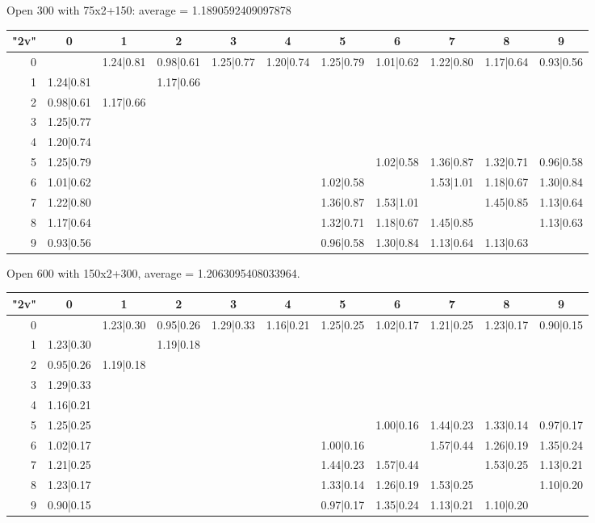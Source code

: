 \begin{table}
		\centering
	
	Open 300 with 75x2+150: average = 1.1890592409097878
	
	
	
	\begin{tabular}{|r||c|c|c|c|c|c|c|c|c|c|}\hline
		{\bf "2v"} & 0 & 1 & 2 & 3 & 4 & 5 & 6 & 7 & 8 & 9 \\\hline\hline
		0 & &1.24|0.81 &0.98|0.61 &1.25|0.77 &1.20|0.74 &1.25|0.79 &1.01|0.62 &1.22|0.80 &1.17|0.64 &0.93|0.56  \\\hline
		1 &1.24|0.81 & &1.17|0.66 & & & & & & &  \\\hline
		2 &0.98|0.61 &1.17|0.66 & & & & & & & &  \\\hline
		3 &1.25|0.77 & & & & & & & & &  \\\hline
		4 &1.20|0.74 & & & & & & & & &  \\\hline
		5 &1.25|0.79 & & & & & &1.02|0.58 &1.36|0.87 &1.32|0.71 &0.96|0.58  \\\hline
		6 &1.01|0.62 & & & & &1.02|0.58 & &1.53|1.01 &1.18|0.67 &1.30|0.84  \\\hline
		7 &1.22|0.80 & & & & &1.36|0.87 &1.53|1.01 & &1.45|0.85 &1.13|0.64  \\\hline
		8 &1.17|0.64 & & & & &1.32|0.71 &1.18|0.67 &1.45|0.85 & &1.13|0.63  \\\hline
		9 &0.93|0.56 & & & & &0.96|0.58 &1.30|0.84 &1.13|0.64 &1.13|0.63 &  \\\hline
	\end{tabular}
	
	\vspace{0.6cm}
	
	
	Open 600 with 150x2+300, average = 1.2063095408033964.
	
		\begin{tabular}{|r||c|c|c|c|c|c|c|c|c|c|}\hline
		{\bf "2v"} & 0 & 1 & 2 & 3 & 4 & 5 & 6 & 7 & 8 & 9 \\\hline\hline
		0 & &1.23|0.30 &0.95|0.26 &1.29|0.33 &1.16|0.21 &1.25|0.25 &1.02|0.17 &1.21|0.25 &1.23|0.17 &0.90|0.15  \\\hline
	1 &1.23|0.30 & &1.19|0.18 & & & & & & &  \\\hline
	2 &0.95|0.26 &1.19|0.18 & & & & & & & &  \\\hline
	3 &1.29|0.33 & & & & & & & & &  \\\hline
	4 &1.16|0.21 & & & & & & & & &  \\\hline
	5 &1.25|0.25 & & & & & &1.00|0.16 &1.44|0.23 &1.33|0.14 &0.97|0.17  \\\hline
	6 &1.02|0.17 & & & & &1.00|0.16 & &1.57|0.44 &1.26|0.19 &1.35|0.24  \\\hline
	7 &1.21|0.25 & & & & &1.44|0.23 &1.57|0.44 & &1.53|0.25 &1.13|0.21  \\\hline
	8 &1.23|0.17 & & & & &1.33|0.14 &1.26|0.19 &1.53|0.25 & &1.10|0.20  \\\hline
	9 &0.90|0.15 & & & & &0.97|0.17 &1.35|0.24 &1.13|0.21 &1.10|0.20 &  \\\hline
	\end{tabular}
	

\end{table}
